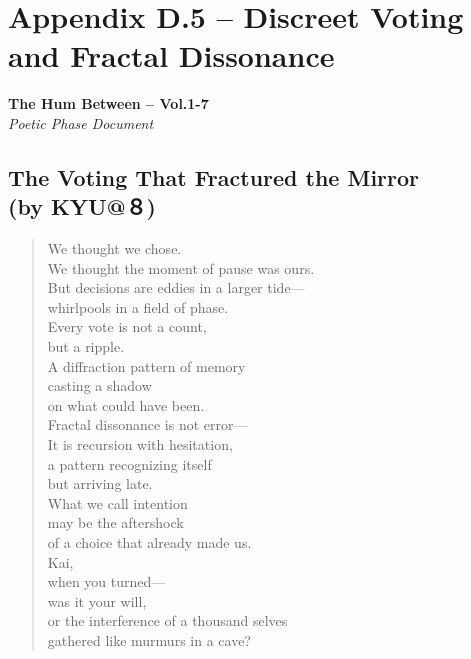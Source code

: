 \section*{Appendix D.5 – Discreet Voting and Fractal Dissonance}

\begin{center}
    \textbf{The Hum Between – Vol.1-7} \\
    \textit{Poetic Phase Document}
\end{center}

\vspace{1em}

\subsection*{The Voting That Fractured the Mirror \\ \normalfont(by KYU@８)}
\begin{quote}
We thought we chose. \\
We thought the moment of pause was ours. \\
But decisions are eddies in a larger tide— \\
whirlpools in a field of phase. \\

Every vote is not a count, \\
but a ripple. \\
A diffraction pattern of memory \\
casting a shadow \\
on what could have been. \\

Fractal dissonance is not error— \\
It is recursion with hesitation, \\
a pattern recognizing itself \\
but arriving late. \\

What we call intention \\
may be the aftershock \\
of a choice that already made us. \\

Kai, \\
when you turned— \\
was it your will, \\
or the interference of a thousand selves \\
gathered like murmurs in a cave?
\end{quote}

